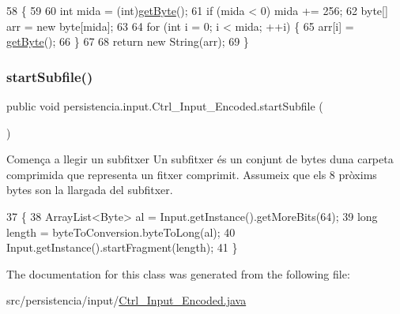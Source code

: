 \begin{DoxyCode}
58                             \{
59         
60         \textcolor{keywordtype}{int} mida = (int)\hyperlink{classpersistencia_1_1input_1_1Ctrl__Input__Encoded_a38ede6bc49251e77ae4be30ccc06457d}{getByte}();
61         \textcolor{keywordflow}{if} (mida < 0) mida += 256;
62         byte[] arr = \textcolor{keyword}{new} byte[mida];
63 
64         \textcolor{keywordflow}{for} (\textcolor{keywordtype}{int} i = 0; i < mida; ++i) \{
65             arr[i] = \hyperlink{classpersistencia_1_1input_1_1Ctrl__Input__Encoded_a38ede6bc49251e77ae4be30ccc06457d}{getByte}();
66         \}
67 
68         \textcolor{keywordflow}{return} \textcolor{keyword}{new} String(arr);
69     \}
\end{DoxyCode}
\mbox{\label{classpersistencia_1_1input_1_1Ctrl__Input__Encoded_ababb8ac0798194f61c4a77d1ddf5947e}} 
\subsubsection{\texorpdfstring{start\+Subfile()}{startSubfile()}}
{\footnotesize\ttfamily public void persistencia.\+input.\+Ctrl\+\_\+\+Input\+\_\+\+Encoded.\+start\+Subfile (\begin{DoxyParamCaption}{ }\end{DoxyParamCaption})\hspace{0.3cm}{\ttfamily [inline]}}



Comença a llegir un subfitxer Un subfitxer és un conjunt de bytes d\textquotesingle{}una carpeta comprimida que representa un fitxer comprimit. Assumeix que els 8 pròxims bytes son la llargada del subfitxer. 


\begin{DoxyCode}
37                                \{
38         ArrayList<Byte> al = Input.getInstance().getMoreBits(64);
39         \textcolor{keywordtype}{long} length = byteToConversion.byteToLong(al);
40         Input.getInstance().startFragment(length);
41     \}
\end{DoxyCode}


The documentation for this class was generated from the following file\+:\begin{DoxyCompactItemize}
\item 
src/persistencia/input/\hyperlink{Ctrl__Input__Encoded_8java}{Ctrl\+\_\+\+Input\+\_\+\+Encoded.\+java}\end{DoxyCompactItemize}
